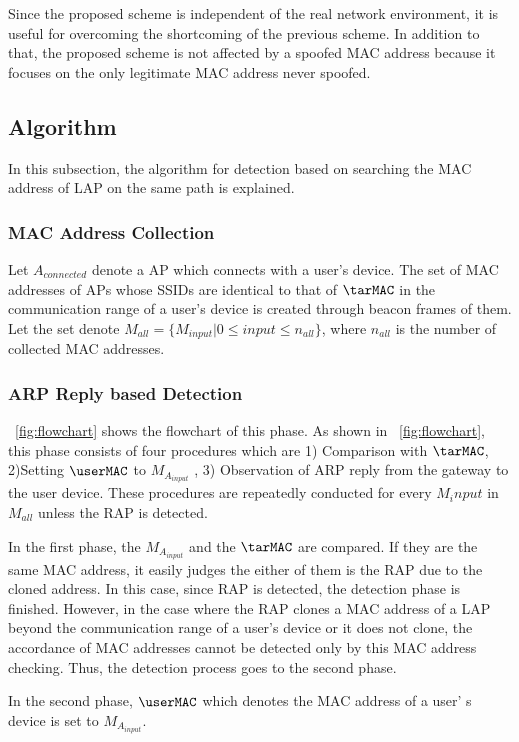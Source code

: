 \documentclass[conference]{IEEEtran}
\begin{document}
Since the proposed scheme is independent of the real network environment, it is useful for overcoming the shortcoming of the previous scheme.
In addition to that, the proposed scheme is not affected by a spoofed MAC address because it focuses on the only legitimate MAC address never spoofed.

\subsection{Algorithm}
In this subsection, the algorithm for detection based on searching the MAC address of LAP on the same path is explained.

\subsubsection{MAC Address Collection}
Let \newcommand{\tarAP}{A_{connected}}$\tarAP$ denote a AP which connects with a user's device.
The set of MAC addresses of APs whose SSIDs are identical to that of $\tarMAC$  in the communication range of a user's device is created through beacon frames of them. 
Let the set denote $M_{all}=\{M_{input}|0\le input \le n_{all}  \}$, where $n_{all}$ is the number of collected MAC addresses.

\subsubsection{ARP Reply based Detection}
\figurename~\ref{fig:flowchart} shows the flowchart of this phase.
As shown in \figurename~\ref{fig:flowchart}, this phase consists of four procedures which are 1) Comparison with $\tarMAC$, 2)Setting $\userMAC$ to \newcommand{\inputMAC}{M_{A_{input}}}$\inputMAC$ , 3) Observation of ARP reply from the gateway to the user device.
These procedures are repeatedly conducted for every $M_input$ in $M_{all}$ unless the RAP is detected.

In the first phase, the $\inputMAC$ and the $\tarMAC$ are compared.
If they are the same MAC address, it easily judges the either of them is the RAP due to the cloned address.
In this case, since RAP is detected, the detection phase is finished.
However, in the case where the RAP clones a MAC address of a LAP beyond the communication range of a user's device or it does not clone, the accordance of MAC addresses cannot be detected only by this MAC address checking.
Thus, the detection process goes to the second phase.

In the second phase, $\userMAC$ which denotes the MAC address of a user' s device is set to $\inputMAC$.
\end{document}
